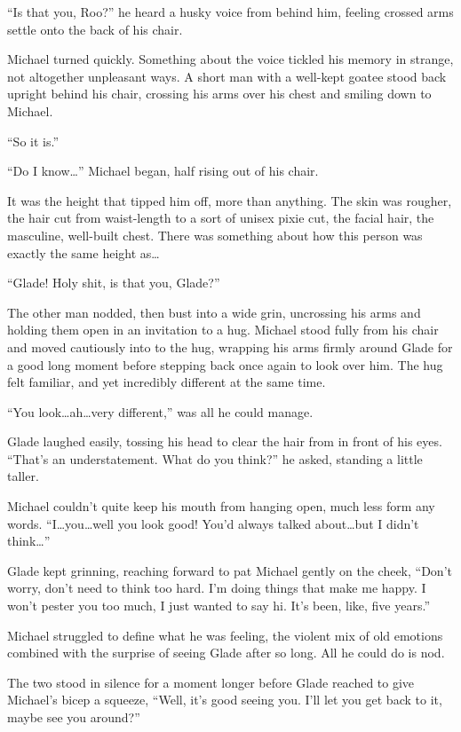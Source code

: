 \documentclass[12pt,letterpaper,oneside]{memoir}
\begin{document}
  ``Is that you, Roo?'' he heard a husky voice from behind him, feeling crossed arms settle onto the back of his chair.

  Michael turned quickly.  Something about the voice tickled his memory in strange, not altogether unpleasant ways.  A short man with a well-kept goatee stood back upright behind his chair, crossing his arms over his chest and smiling down to Michael.

  ``So it is.''

  ``Do I know\ldots{}'' Michael began, half rising out of his chair.

  It was the height that tipped him off, more than anything.  The skin was rougher, the hair cut from waist-length to a sort of unisex pixie cut, the facial hair, the masculine, well-built chest.  There was something about how this person was exactly the same height as\ldots{}

  ``Glade!  Holy shit, is that you, Glade?''

  The other man nodded, then bust into a wide grin, uncrossing his arms and holding them open in an invitation to a hug.  Michael stood fully from his chair and moved cautiously into to the hug, wrapping his arms firmly around Glade for a good long moment before stepping back once again to look over him.  The hug felt familiar, and yet incredibly different at the same time.

  ``You look\ldots{}ah\ldots{}very different,'' was all he could manage.

  Glade laughed easily, tossing his head to clear the hair from in front of his eyes.  ``That's an understatement.  What do you think?'' he asked, standing a little taller.

  Michael couldn't quite keep his mouth from hanging open, much less form any words.  ``I\ldots{}you\ldots{}well you look good!  You'd always talked about\ldots{}but I didn't think\ldots{}''

  Glade kept grinning, reaching forward to pat Michael gently on the cheek, ``Don't worry, don't need to think too hard.  I'm doing things that make me happy.  I won't pester you too much, I just wanted to say hi.  It's been, like, five years.''

  Michael struggled to define what he was feeling, the violent mix of old emotions combined with the surprise of seeing Glade after so long.  All he could do is nod.

  The two stood in silence for a moment longer before Glade reached to give Michael's bicep a squeeze, ``Well, it's good seeing you.  I'll let you get back to it, maybe see you around?''
\end{document}

